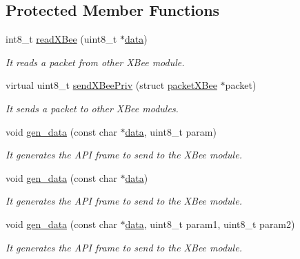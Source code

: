 \subsection*{Protected Member Functions}
\begin{DoxyCompactItemize}
\item 
int8\+\_\+t \hyperlink{class_wasp_x_bee_core_aff61b0e31acc5abe4a07098916b7796f}{read\+X\+Bee} (uint8\+\_\+t $\ast$\hyperlink{class_wasp_x_bee_core_a81f1c2af5c45fc8e3b63f8f21b3df17f}{data})
\begin{DoxyCompactList}\small\item\em It reads a packet from other X\+Bee module. \end{DoxyCompactList}\item 
virtual uint8\+\_\+t \hyperlink{class_wasp_x_bee_core_a021b4bfd9bd565b6a6448043610e5548}{send\+X\+Bee\+Priv} (struct \hyperlink{structpacket_x_bee}{packet\+X\+Bee} $\ast$packet)
\begin{DoxyCompactList}\small\item\em It sends a packet to other X\+Bee modules. \end{DoxyCompactList}\item 
void \hyperlink{class_wasp_x_bee_core_a6d596334b27604bf40001d3f223bb684}{gen\+\_\+data} (const char $\ast$\hyperlink{class_wasp_x_bee_core_a81f1c2af5c45fc8e3b63f8f21b3df17f}{data}, uint8\+\_\+t param)
\begin{DoxyCompactList}\small\item\em It generates the A\+PI frame to send to the X\+Bee module. \end{DoxyCompactList}\item 
void \hyperlink{class_wasp_x_bee_core_a70ea5a036dc3b769052fc42301049196}{gen\+\_\+data} (const char $\ast$\hyperlink{class_wasp_x_bee_core_a81f1c2af5c45fc8e3b63f8f21b3df17f}{data})
\begin{DoxyCompactList}\small\item\em It generates the A\+PI frame to send to the X\+Bee module. \end{DoxyCompactList}\item 
void \hyperlink{class_wasp_x_bee_core_a559ea344983bcbe88739e728513b1638}{gen\+\_\+data} (const char $\ast$\hyperlink{class_wasp_x_bee_core_a81f1c2af5c45fc8e3b63f8f21b3df17f}{data}, uint8\+\_\+t param1, uint8\+\_\+t param2)
\begin{DoxyCompactList}\small\item\em It generates the A\+PI frame to send to the X\+Bee module. \end{DoxyCompactList}\item 

\end{DoxyCompactItemize}
